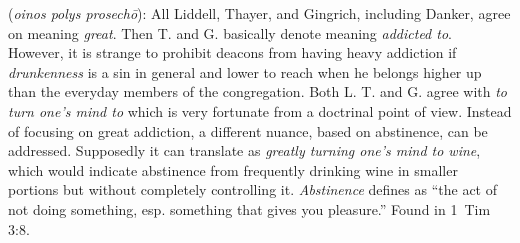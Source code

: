 \item[Wine abstinence,]

(\textit{oinos polys prosechō}):
All Liddell, Thayer, and Gingrich, including Danker, agree on  meaning \emph{great}. Then T. and G. basically denote  meaning \emph{addicted to}. However, it is strange to prohibit deacons from having heavy addiction if \emph{drunkenness} is a sin in general and lower to reach when he belongs higher up than the everyday members of the congregation. Both L. T. and G. agree with \emph{to turn one's mind to} which is very fortunate from a doctrinal point of view. Instead of focusing on great addiction, a different nuance, based on abstinence, can be addressed. Supposedly it can translate as \emph{greatly turning one's mind to wine}, which would indicate abstinence from frequently drinking wine in smaller portions but without completely controlling it. \emph{Abstinence} defines as ``the act of not doing something, esp. something that gives you pleasure.''
Found in 1~Tim 3:8.
